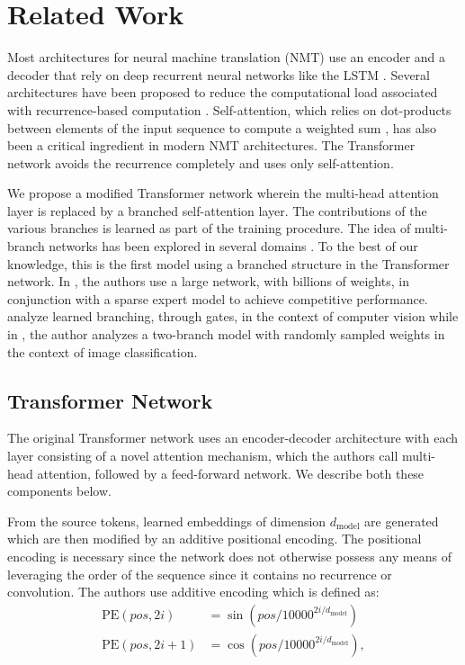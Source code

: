 \documentclass{article} %
\begin{document}
\section{Related Work}
Most architectures for neural machine translation (NMT) use an encoder and a decoder that rely on deep recurrent neural networks like the LSTM \citep{luong2015effective,sutskever2014sequence,bahdanau2014neural,wu2016google,barone2017deep,cho2014learning}. Several architectures have been proposed to reduce the computational load associated with recurrence-based computation \citep{gehring2016convenc,gehring2017convs2s,kaiser2016can,kalchbrenner2016neural}. Self-attention, which relies on dot-products between elements of the input sequence to compute a weighted sum \citep{lin2017structured,bahdanau2014neural,parikh2016decomposable,kim2017structured}, has also been a critical ingredient in modern NMT architectures. The Transformer network \citep{vaswani2017attention} avoids the recurrence completely and uses only self-attention. 

We propose a modified Transformer network wherein the multi-head attention layer is replaced by a branched self-attention layer. The contributions of the various branches is learned as part of the training procedure. The idea of multi-branch networks has been explored in several domains \citep{ahmed2017branchconnect,gastaldi2017shake,shazeer2017outrageously,xie2016aggregated}. To the best of our knowledge, this is the first model using a branched structure in the Transformer network. In \citet{shazeer2017outrageously}, the authors use a large network, with billions of weights, in conjunction with a sparse expert model to achieve competitive performance. \citet{ahmed2017branchconnect} analyze learned branching, through gates, in the context of computer vision while in \citet{gastaldi2017shake}, the author analyzes a two-branch model with randomly sampled weights in the context of image classification.  


\subsection{Transformer Network}
The original Transformer network uses an encoder-decoder architecture with each layer consisting of a novel attention mechanism, which the authors call multi-head attention, followed by a feed-forward network. We describe both these components below.

From the source tokens, learned embeddings of dimension ${d_{\text{model}}}$ are generated which are then modified by an additive positional encoding. The positional encoding is necessary since the network does not otherwise possess any means of leveraging the order of the sequence since it contains no recurrence or convolution. The authors use additive encoding which is defined as:
\begin{align*}
\text{PE}(pos, 2i) &= \sin(pos/10000^{2i/d_{\text{model}}}) \\
\text{PE}(pos, 2i+1) &= \cos(pos/10000^{2i/d_{\text{model}}}),
\end{align*}
\end{document}
